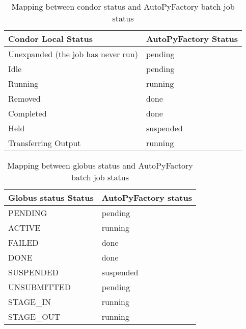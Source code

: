 \documentclass[a4paper]{jpconf}
\begin{document}
\begin{table}
   \begin{center}
      \begin{tabular}{l l}
         \hline
         \textbf{Condor Local Status}  & \textbf{AutoPyFactory Status}       \\ 
         \hline
         Unexpanded (the job has never run)    &  pending     \\
         Idle                                  &  pending     \\
         Running                               &  running     \\
         Removed                               &  done        \\
         Completed                             &  done        \\
         Held                                  &  suspended   \\
         Transferring Output                   &  running     \\
         \hline
      \end{tabular}
   \end{center}
   \caption{Mapping between condor status and AutoPyFactory batch job status}
   \label{translation}
\end{table}

\begin{table}
   \begin{center}
      \begin{tabular}{l l}
         \hline
         \textbf{Globus status Status}   & \textbf{AutoPyFactory status}       \\ 
         \hline
         PENDING       &   pending    \\
         ACTIVE        &   running    \\
         FAILED        &   done       \\
         DONE          &   done       \\
         SUSPENDED     &   suspended  \\
         UNSUBMITTED   &   pending    \\
         STAGE\_IN     &   running    \\
         STAGE\_OUT    &   running    \\
         \hline
      \end{tabular}
   \end{center}
   \caption{Mapping between globus status and AutoPyFactory batch job status}
   \label{translation}
\end{table}
\end{document}
